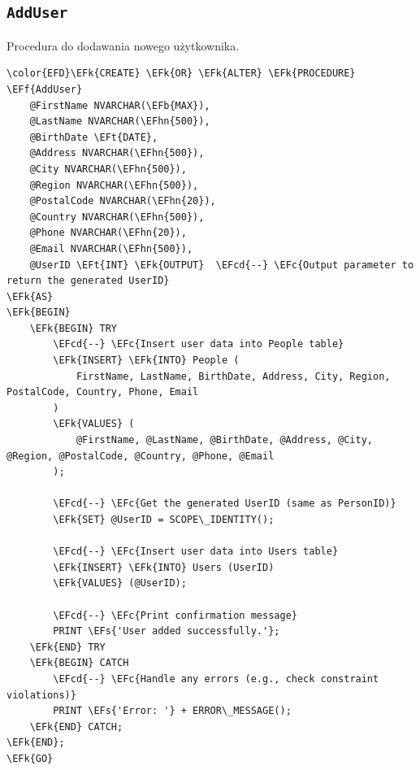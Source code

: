 \documentclass[11pt]{article}
\newcommand{\EFc}[1]{\textcolor{EFc}{\textit{#1}}} %
\newcommand{\EFcd}[1]{\textcolor{EFcd}{\textit{#1}}} %
\newcommand{\EFs}[1]{\textcolor{EFs}{#1}} %
\newcommand{\EFk}[1]{\textcolor{EFk}{\textbf{#1}}} %
\newcommand{\EFb}[1]{\textcolor{EFb}{\textbf{#1}}} %
\newcommand{\EFf}[1]{\textcolor{EFf}{#1}} %
\newcommand{\EFt}[1]{\textcolor{EFt}{\textbf{#1}}} %
\newcommand{\EFhn}[1]{\textcolor{EFhn}{#1}} %
\begin{document}
\subsection{\texttt{AddUser}}
\label{sec:org9c408c6}
Procedura do dodawania nowego użytkownika.
\begin{Code}
\begin{Verbatim}
\color{EFD}\EFk{CREATE} \EFk{OR} \EFk{ALTER} \EFk{PROCEDURE} \EFf{AddUser}
    @FirstName NVARCHAR(\EFb{MAX}),
    @LastName NVARCHAR(\EFhn{500}),
    @BirthDate \EFt{DATE},
    @Address NVARCHAR(\EFhn{500}),
    @City NVARCHAR(\EFhn{500}),
    @Region NVARCHAR(\EFhn{500}),
    @PostalCode NVARCHAR(\EFhn{20}),
    @Country NVARCHAR(\EFhn{500}),
    @Phone NVARCHAR(\EFhn{20}),
    @Email NVARCHAR(\EFhn{500}),
    @UserID \EFt{INT} \EFk{OUTPUT}  \EFcd{--} \EFc{Output parameter to return the generated UserID}
\EFk{AS}
\EFk{BEGIN}
    \EFk{BEGIN} TRY
        \EFcd{--} \EFc{Insert user data into People table}
        \EFk{INSERT} \EFk{INTO} People (
            FirstName, LastName, BirthDate, Address, City, Region, PostalCode, Country, Phone, Email
        )
        \EFk{VALUES} (
            @FirstName, @LastName, @BirthDate, @Address, @City, @Region, @PostalCode, @Country, @Phone, @Email
        );

        \EFcd{--} \EFc{Get the generated UserID (same as PersonID)}
        \EFk{SET} @UserID = SCOPE\_IDENTITY();

        \EFcd{--} \EFc{Insert user data into Users table}
        \EFk{INSERT} \EFk{INTO} Users (UserID)
        \EFk{VALUES} (@UserID);

        \EFcd{--} \EFc{Print confirmation message}
        PRINT \EFs{'User added successfully.'};
    \EFk{END} TRY
    \EFk{BEGIN} CATCH
        \EFcd{--} \EFc{Handle any errors (e.g., check constraint violations)}
        PRINT \EFs{'Error: '} + ERROR\_MESSAGE();
    \EFk{END} CATCH;
\EFk{END};
\EFk{GO}
\end{Verbatim}
\end{Code}
\end{document}
